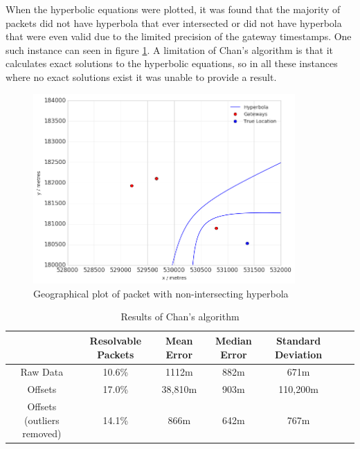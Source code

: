 \documentclass[a4paper]{report}
\begin{document}
    When the hyperbolic equations were plotted, it was found that the majority of packets did not have hyperbola that ever intersected or did not have hyperbola that were even valid due to the limited precision of the gateway timestamps. One such instance can seen in figure \ref{fig:hyperbolanointersect}. A limitation of Chan's algorithm is that it calculates exact solutions to the hyperbolic equations, so in all these instances where no exact solutions exist it was unable to provide a result.

    \begin{figure}[ht]
    \centering
    \includegraphics[width=10cm]{figures/hyperbolanointersect.png}
    \caption{Geographical plot of packet with non-intersecting hyperbola}
    \label{fig:hyperbolanointersect}
    \end{figure}

    \begin{table}[ht]
      \begin{center}
        \caption{Results of Chan's algorithm}
        \label{tab:chanresults}
        \begin{tabular}{|c|c|c|c|c|c|c|}
          \hline
           & Resolvable Packets & Mean Error & Median Error & Standard Deviation \\
          \hline
          Raw Data & 10.6\% & 1112m & 882m & 671m \\
          \hline
          Offsets & 17.0\% & 38,810m & 903m & 110,200m \\
          \hline
          Offsets (outliers removed) & 14.1\% & 866m & 642m & 767m \\
          \hline
        \end{tabular}
      \end{center}
    \end{table}
\end{document}
